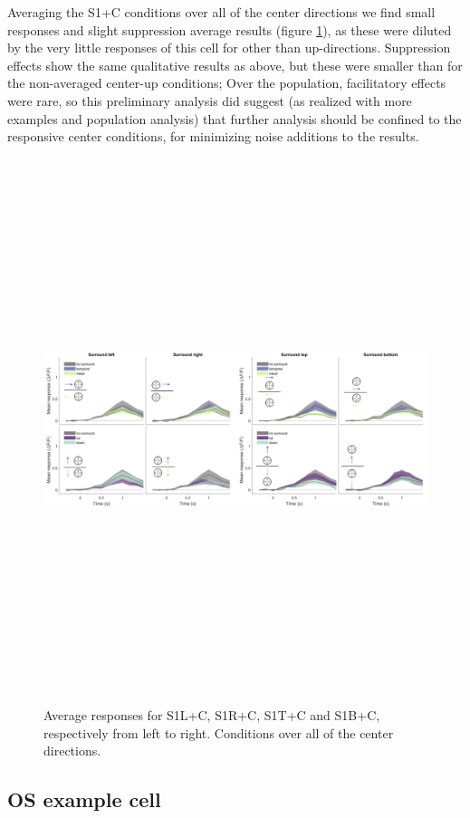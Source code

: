 Averaging the S1+C conditions over all of the center directions we find small responses and slight suppression average results (figure \ref{DSexamplecellaverage}), as these were diluted by the very little responses of this cell for other than up-directions. Suppression effects show the same qualitative results as above, but these were smaller than for the non-averaged center-up conditions; Over the population, facilitatory effects were rare, so this preliminary analysis did suggest (as realized with more examples and population analysis) that further analysis should be confined to the responsive center conditions, for minimizing noise additions to the results.

\begin{figure}[H] \centering \includegraphics[width=15.9cm,height=15.9cm,keepaspectratio]{Figures/7.Results/individualSM/roi_29_mf379_pos5/4.png} 
\caption{Average responses for S1L+C, S1R+C, S1T+C and S1B+C, respectively from left to right. Conditions over all of the center directions.
\label{DSexamplecellaverage}}
\end{figure}

\subsection{OS example cell}

